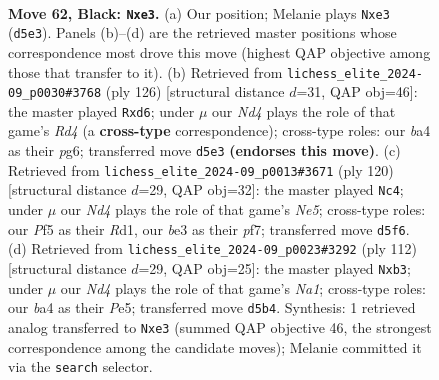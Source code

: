 \documentclass[11pt]{article}
\begin{document}
\clearpage

\begin{figure}[p]\centering
\begin{subfigure}{0.46\textwidth}\centering
\resizebox{\linewidth}{!}{%
\newchessgame
\chessboard[
  setfen={8/1kp3R1/8/3n1p2/B4P2/4B3/3K3P/8 b - - 6 62},
  showmover=false,
  pgfstyle=straightmove, color=movearrow, markmove={d5-e3}
]}
\caption{}
\end{subfigure}\hfill
\begin{subfigure}{0.46\textwidth}\centering
\resizebox{\linewidth}{!}{%
\newchessgame
\chessboard[
  setfen={8/1K2k3/1PPb2p1/8/3R4/8/8/1r6 w - - 5 64},
  showmover=false,
  pgfstyle=straightmove, color=movearrow, markmove={d4-d6}
]}
\caption{}
\end{subfigure}
\\[4pt]
\begin{subfigure}{0.46\textwidth}\centering
\resizebox{\linewidth}{!}{%
\newchessgame
\chessboard[
  setfen={3b4/1K1P1pk1/1P6/p3N3/5P2/8/1r6/3R4 w - - 1 61},
  showmover=false,
  pgfstyle=straightmove, color=movearrow, markmove={e5-c4}
]}
\caption{}
\end{subfigure}\hfill
\begin{subfigure}{0.46\textwidth}\centering
\resizebox{\linewidth}{!}{%
\newchessgame
\chessboard[
  setfen={5k1r/7P/4p2K/3pP3/3P4/1b6/p7/N7 w - - 0 57},
  showmover=false,
  pgfstyle=straightmove, color=movearrow, markmove={a1-b3}
]}
\caption{}
\end{subfigure}
\caption{\textbf{Move 62, Black: \texttt{Nxe3}.} (a) Our position; Melanie plays \texttt{Nxe3} (\texttt{d5e3}). Panels (b)--(d) are the retrieved master positions whose correspondence most drove this move (highest QAP objective among those that transfer to it). (b) Retrieved from \texttt{lichess\_elite\_2024-09\_p0030\#3768} (ply 126) [structural distance $d$=31, QAP obj=46]: the master played \texttt{Rxd6}; under $\mu$ our \emph{Nd4} plays the role of that game's \emph{Rd4} (a \textbf{cross-type} correspondence); cross-type roles: our \emph{b}a4 as their \emph{p}g6; transferred move \texttt{d5e3} \textbf{(endorses this move)}. (c) Retrieved from \texttt{lichess\_elite\_2024-09\_p0013\#3671} (ply 120) [structural distance $d$=29, QAP obj=32]: the master played \texttt{Nc4}; under $\mu$ our \emph{Nd4} plays the role of that game's \emph{Ne5}; cross-type roles: our \emph{P}f5 as their \emph{R}d1, our \emph{b}e3 as their \emph{p}f7; transferred move \texttt{d5f6}. (d) Retrieved from \texttt{lichess\_elite\_2024-09\_p0023\#3292} (ply 112) [structural distance $d$=29, QAP obj=25]: the master played \texttt{Nxb3}; under $\mu$ our \emph{Nd4} plays the role of that game's \emph{Na1}; cross-type roles: our \emph{b}a4 as their \emph{P}e5; transferred move \texttt{d5b4}. Synthesis: 1 retrieved analog transferred to \texttt{Nxe3} (summed QAP objective 46, the strongest correspondence among the candidate moves); Melanie committed it via the \texttt{search} selector.}
\label{fig:thought-m123}
\end{figure}
\end{document}
